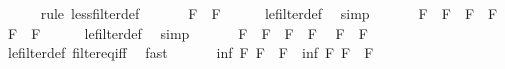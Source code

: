 \begin{isabellebody}
\ \ \ \ \isamarkupfalse%
\ {\isacharparenleft}{\kern0pt}rule\ less{\isacharunderscore}{\kern0pt}filter{\isacharunderscore}{\kern0pt}def{\isacharparenright}{\kern0pt}\ \isacommand{{\isacharbraceright}{\kern0pt}}\isamarkupfalse%
\isanewline
\ \ \isacommand{{\isacharbraceleft}{\kern0pt}}\isamarkupfalse%
\ \isamarkupfalse%
\ {\isachardoublequoteopen}F\ {\isasymle}\ F{\isachardoublequoteclose}\isanewline
\ \ \ \ \isamarkupfalse%
\ le{\isacharunderscore}{\kern0pt}filter{\isacharunderscore}{\kern0pt}def\ \isamarkupfalse%
\ simp\ \isacommand{{\isacharbraceright}{\kern0pt}}\isamarkupfalse%
\isanewline
\ \ \isacommand{{\isacharbraceleft}{\kern0pt}}\isamarkupfalse%
\ \isamarkupfalse%
\ {\isachardoublequoteopen}F\ {\isasymle}\ F{\isacharprime}{\kern0pt}{\isachardoublequoteclose}\ \ {\isachardoublequoteopen}F{\isacharprime}{\kern0pt}\ {\isasymle}\ F{\isacharprime}{\kern0pt}{\isacharprime}{\kern0pt}{\isachardoublequoteclose}\ \isamarkupfalse%
\ {\isachardoublequoteopen}F\ {\isasymle}\ F{\isacharprime}{\kern0pt}{\isacharprime}{\kern0pt}{\isachardoublequoteclose}\isanewline
\ \ \ \ \isamarkupfalse%
\ le{\isacharunderscore}{\kern0pt}filter{\isacharunderscore}{\kern0pt}def\ \isamarkupfalse%
\ simp\ \isacommand{{\isacharbraceright}{\kern0pt}}\isamarkupfalse%
\isanewline
\ \ \isacommand{{\isacharbraceleft}{\kern0pt}}\isamarkupfalse%
\ \isamarkupfalse%
\ {\isachardoublequoteopen}F\ {\isasymle}\ F{\isacharprime}{\kern0pt}{\isachardoublequoteclose}\ \ {\isachardoublequoteopen}F{\isacharprime}{\kern0pt}\ {\isasymle}\ F{\isachardoublequoteclose}\ \isamarkupfalse%
\ {\isachardoublequoteopen}F\ {\isacharequal}{\kern0pt}\ F{\isacharprime}{\kern0pt}{\isachardoublequoteclose}\isanewline
\ \ \ \ \isamarkupfalse%
\ le{\isacharunderscore}{\kern0pt}filter{\isacharunderscore}{\kern0pt}def\ filter{\isacharunderscore}{\kern0pt}eq{\isacharunderscore}{\kern0pt}iff\ \isamarkupfalse%
\ fast\ \isacommand{{\isacharbraceright}{\kern0pt}}\isamarkupfalse%
\isanewline
\ \ \isacommand{{\isacharbraceleft}{\kern0pt}}\isamarkupfalse%
\ \isamarkupfalse%
\ {\isachardoublequoteopen}inf\ F\ F{\isacharprime}{\kern0pt}\ {\isasymle}\ F{\isachardoublequoteclose}\ \ {\isachardoublequoteopen}inf\ F\ F{\isacharprime}{\kern0pt}\ {\isasymle}\ F{\isacharprime}{\kern0pt}{\isachardoublequoteclose}\isanewline
\ \ \ \ \isamarkupfalse%

\end{isabellebody}
